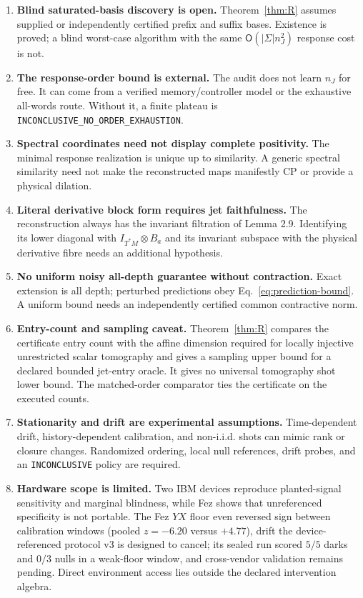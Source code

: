 \documentclass[aps,prl,onecolumn,superscriptaddress,nofootinbib]{revtex4-2}
\begin{document}
\begin{enumerate}
\item[O1.] \textbf{Blind saturated-basis discovery is open.}  Theorem~\ref{thm:R} assumes supplied or independently certified prefix and suffix bases.  Existence is proved; a blind worst-case algorithm with the same $\mathsf O(|\Sigma|n_J^2)$ response cost is not.

\item[O2.] \textbf{The response-order bound is external.}  The audit does not learn $n_J$ for free.  It can come from a verified memory/controller model or the exhaustive all-words route.  Without it, a finite plateau is
\texttt{INCONCLUSIVE\_}\allowbreak\texttt{NO\_ORDER\_}\allowbreak\texttt{EXHAUSTION}.

\item[O3.] \textbf{Spectral coordinates need not display complete positivity.}  The minimal response realization is unique up to similarity.  A generic spectral similarity need not make the reconstructed maps manifestly CP or provide a physical dilation.

\item[O4.] \textbf{Literal derivative block form requires jet faithfulness.}  The reconstruction always has the invariant filtration of Lemma 2.9.  Identifying its lower diagonal with $I_{T^*M}\otimes B_a$ and its invariant subspace with the physical derivative fibre needs an additional hypothesis.

\item[O5.] \textbf{No uniform noisy all-depth guarantee without contraction.}  Exact extension is all depth; perturbed predictions obey Eq.~\eqref{eq:prediction-bound}.  A uniform bound needs an independently certified common contractive norm.

\item[O6.] \textbf{Entry-count and sampling caveat.}  Theorem~\ref{thm:R} compares the certificate entry count with the affine dimension required for locally injective unrestricted scalar tomography and gives a sampling upper bound for a declared bounded jet-entry oracle.  It gives no universal tomography shot lower bound.  The matched-order comparator ties the certificate on the executed counts.

\item[O7.] \textbf{Stationarity and drift are experimental assumptions.}  Time-dependent drift, history-dependent calibration, and non-i.i.d. shots can mimic rank or closure changes.  Randomized ordering, local null references, drift probes, and an \texttt{INCONCLUSIVE} policy are required.

\item[O8.] \textbf{Hardware scope is limited.}  Two IBM devices reproduce planted-signal sensitivity and marginal blindness, while Fez shows that unreferenced specificity is not portable.  The Fez $YX$ floor even reversed sign between calibration windows (pooled $z=-6.20$ versus $+4.77$), drift the device-referenced protocol v3 is designed to cancel; its sealed run scored $5/5$ darks and $0/3$ nulls in a weak-floor window, and cross-vendor validation remains pending.  Direct environment access lies outside the declared intervention algebra.
\end{enumerate}
\end{document}
